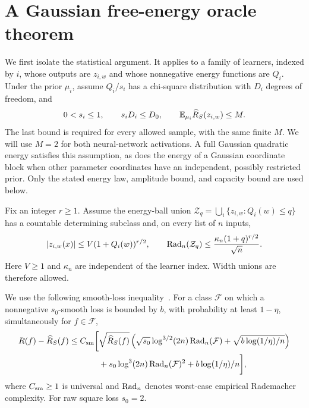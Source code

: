 \section{A Gaussian free-energy oracle theorem}
\label{sec:abstract}
We first isolate the statistical argument. It applies to a family of learners, indexed by $i$, whose outputs are $z_{i,w}$ and whose nonnegative energy functions are $Q_i$. Under the prior $\mu_i$, assume $Q_i/s_i$ has a chi-square distribution with $D_i$ degrees of freedom, and
\begin{equation}
 0<s_i\le1,\qquad s_iD_i\le D_0,
 \qquad \mathbb E_{\mu_i}\widehat R_S(z_{i,w})\le M.
 \label{eq:abstract-prior}
\end{equation}
The last bound is required for every allowed sample, with the same finite $M$. We will use $M=2$ for both neural-network activations. A full Gaussian quadratic energy satisfies this assumption, as does the energy of a Gaussian coordinate block when other parameter coordinates have an independent, possibly restricted prior. Only the stated energy law, amplitude bound, and capacity bound are used below.

Fix an integer $r\ge1$. Assume the energy-ball union
$\mathcal Z_q=\bigcup_i\{z_{i,w}:Q_i(w)\le q\}$ has a countable determining subclass and, on every list of $n$ inputs,
\begin{equation}
 |z_{i,w}(x)|\le V(1+Q_i(w))^{r/2},\qquad
 \operatorname{Rad}_n(\mathcal Z_q)\le\frac{\kappa_n(1+q)^{r/2}}{\sqrt n}.
 \label{eq:abstract-capacity}
\end{equation}
Here $V\ge1$ and $\kappa_n$ are independent of the learner index. Width unions are therefore allowed.

We use the following smooth-loss inequality~\cite[Theorem~1]{sst}. For a class $\mathcal F$ on which a nonnegative $s_0$-smooth loss is bounded by $b$, with probability at least $1-\eta$, simultaneously for $f\in\mathcal F$,
\begin{align}
 R(f)-\widehat R_S(f)\le C_{\rm sm}\bigg[&\sqrt{\widehat R_S(f)}
 \left(\sqrt{s_0}\log^{3/2}(2n)\operatorname{Rad}_n(\mathcal F)
       +\sqrt{b\log(1/\eta)/n}\right)\notag\\
 &+s_0\log^3(2n)\operatorname{Rad}_n(\mathcal F)^2+b\log(1/\eta)/n\bigg],
 \label{eq:sst}
\end{align}
where $C_{\rm sm}\ge1$ is universal and $\operatorname{Rad}_n$ denotes worst-case empirical Rademacher complexity. For raw square loss $s_0=2$.

